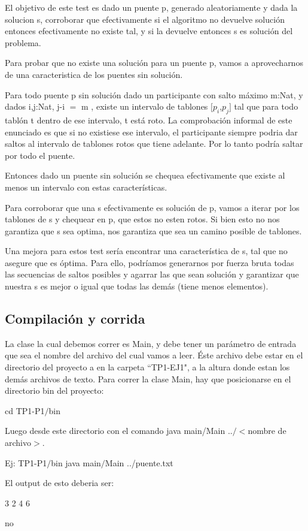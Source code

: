 El objetivo de este test es dado un puente p, generado aleatoriamente y dada la solucion s, corroborar que efectivamente si el algoritmo no devuelve soluci\'on entonces efectivamente no existe tal, y si la devuelve entonces s es soluci\'on del problema.

Para probar que no existe una soluci\'on para un puente p, vamos a aprovecharnos de una caracteristica de los puentes sin soluci\'on.

Para todo puente p sin soluci\'on dado un participante con salto m\'aximo m:Nat, y dados i,j:Nat, j-i $=$ m , existe un intervalo de tablones $[p_{i}$,$p_{j}]$ tal que para todo tabl\'on t dentro de ese intervalo, t est\'a roto.
La comprobaci\'on informal de este enunciado es que si no existiese ese intervalo, el participante siempre podria dar saltos al intervalo de tablones rotos que tiene adelante. Por lo tanto podr\'ia saltar por todo el puente.

Entonces dado un puente sin soluci\'on se chequea efectivamente que existe al menos un intervalo con estas caracter\'isticas.

Para corroborar que una s efectivamente es soluci\'on de p, vamos a iterar por los tablones de s y chequear en p, que estos no esten rotos.
Si bien esto no nos garantiza que s sea optima, nos garantiza que sea un camino posible de tablones.

Una mejora para estos test ser\'ia encontrar una caracter\'istica de s, tal que no asegure que es \'optima. Para ello, podr\'iamos generarnos por fuerza bruta todas las secuencias de saltos posibles y agarrar las que sean soluci\'on y garantizar que nuestra s es mejor o igual que todas las dem\'as (tiene menos elementos).

\subsection{Compilaci\'on y corrida}


La clase la cual debemos correr es Main, y debe tener un par\'ametro de entrada que sea el nombre del archivo del cual vamos a leer. \'Este archivo debe estar en el directorio del proyecto a en la carpeta ``TP1-EJ1", a la altura donde estan los dem\'as archivos de texto.
Para correr la clase Main, hay que posicionarse en el directorio bin del proyecto:

cd TP1-P1$/$bin

Luego desde este directorio con el comando java main/Main ..$/$$<$nombre de archivo$>$.

Ej: TP1-P1$/$bin java main$/$Main ../puente.txt

El output de esto deberia ser: 

3 2 4 6

no

 